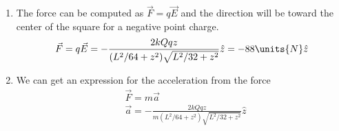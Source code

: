 {\begin{enumerate}
\begin{align*}
        &a=\frac{L}{4},\quad\lambda=\frac{Q}{L}\\
        &E_z=\frac{\frac{1}{2}kQ z}{(L^2/64+z^2)\sqrt{L^2/32+z^2}}\\
        &\vec{E}_\text{total}=4E_z\hat{z}=\frac{2kQ z}{(L^2/64+z^2)\sqrt{L^2/32+z^2}}\hat{z}\\
    \end{align*}
    Now we can plug in the values $L=0.16\units{m}$, $Q=40\units{\mu C}$, and $z=0.2\units{m}$ to get the magnitude of the electric field.
    \begin{align*}
        &\vec{E}_\text{total}=\frac{2(8.99\times10^9\units{N\cdot m^2/C^2})(40\times10^{-6}\units{C})(0.2\units{m})}{(0.16^2\units{m^2}/64+(0.2\units{m})^2)\sqrt{(0.16^2\units{m^2}/32+(0.2\units{m})^2)}}\hat{z}=1.76\times10^7\units{N/C}\hat{z}\\
    \end{align*}
    \item The force can be computed as $\vec{F}=q\vec{E}$ and the direction will be toward the center of the square for a negative point charge.
    \begin{align*}
        &\vec{F}=q\vec{E}=-\frac{2kQq z}{(L^2/64+z^2)\sqrt{L^2/32+z^2}}\hat{z}=-88\units{N}\hat{z}\\
    \end{align*}
    \begin{center}
        \end{center}
    \item We can get an expression for the acceleration from the force
    \begin{align*}
        &\vec{F}=m\vec{a}\\
        &\vec{a}=-\frac{2kQq z}{m(L^2/64+z^2)\sqrt{L^2/32+z^2}}\hat{z}\\
    \end{align*}
    \begin{center}
    \end{center}
\end{enumerate}
}{}

